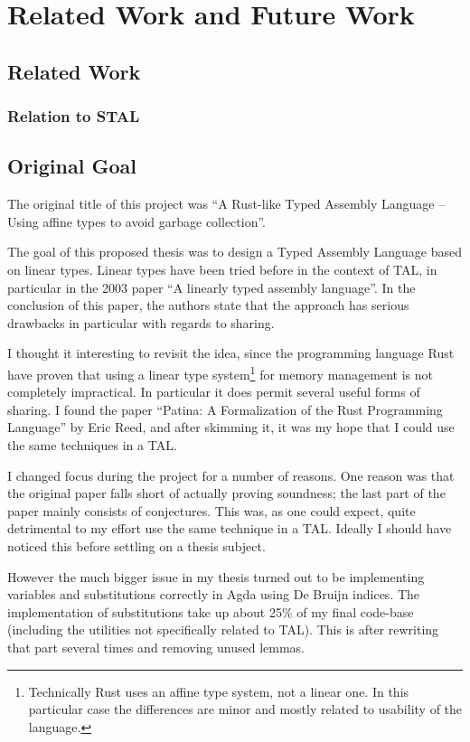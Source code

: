 \chapter{Related Work and Future Work}
\label{chap:future}
\section{Related Work}
\subsection{Relation to STAL}
\label{sec:rel-stal}

\section{Original Goal}

The original title of this project was ``A Rust-like Typed Assembly Language --
Using affine types to avoid garbage collection''.

The goal of this proposed thesis was to design a Typed Assembly Language based
on linear types. Linear types have been tried before in the context of TAL, in
particular in the 2003 paper ``A linearly typed assembly
language''\cite{ltal}. In the conclusion of this paper, the authors state that the approach
has serious drawbacks in particular with regards to sharing.

I thought it interesting to revisit the idea, since the programming language
Rust\cite{rust} have proven that using a linear type system\footnote{Technically
  Rust uses an affine type system, not a linear one. In this particular case the
  differences are minor and mostly related to usability of the language.} for
memory management is not completely impractical. In particular it does permit
several useful forms of sharing. I found the paper ``Patina: A Formalization of
the Rust Programming Language''\cite{patina} by Eric Reed, and after skimming
it, it was my hope that I could use the same techniques in a TAL.

I changed focus during the project for a number of reasons. One reason was that
the original paper falls short of actually proving soundness; the last part of
the paper mainly consists of conjectures. This was, as one could expect, quite
detrimental to my effort use the same technique in a TAL. Ideally I should have
noticed this before settling on a thesis subject.

However the much bigger issue in my thesis turned out to be implementing
variables and substitutions correctly in Agda using De Bruijn indices. The
implementation of substitutions take up about 25\% of my final code-base
(including the utilities not specifically related to TAL). This is after
rewriting that part several times and removing unused lemmas.

